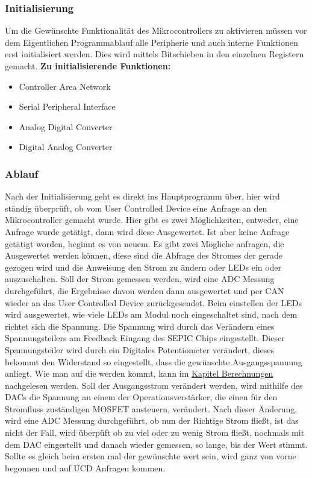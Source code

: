 \documentclass[paper=a4, 12pt]{scrreprt}
\begin{document}
		\subsubsection{Initialisierung}
		Um die Gewünschte Funktionalität des Mikrocontrollers zu aktivieren müssen vor dem Eigentlichen Programmablauf alle Peripherie und auch interne Funktionen erst initialisiert werden. Dies wird mittels Bitschieben in den einzelnen Registern gemacht. \hfill \break \hfill \break		
		\textbf{Zu initialisierende Funktionen:}
		\begin{itemize}
			\item Controller Area Network
			\item Serial Peripheral Interface
			\item Analog Digital Converter
			\item Digital Analog Converter
		\end{itemize}
	
		\subsubsection{Ablauf}
		Nach der Initialisierung geht es direkt ins Hauptprogramm über, hier wird ständig überprüft, ob vom User Controlled Device eine Anfrage an den Mikrocontroller gemacht wurde. Hier gibt es zwei Möglichkeiten, entweder, eine Anfrage wurde getätigt, dann wird diese Ausgewertet. Ist aber keine Anfrage getätigt worden, beginnt es von neuem.\hfill \break \hfill \break
		Es gibt zwei Mögliche anfragen, die Ausgewertet werden können, diese sind die Abfrage des Stromes der gerade gezogen wird und die Anweisung den Strom zu ändern oder LEDs ein oder auszuschalten.\hfill \break \hfill \break
		Soll der Strom gemessen werden, wird eine ADC Messung durchgeführt, die Ergebnisse davon werden dann ausgewertet und per CAN wieder an das User Controlled Device zurückgesendet.\hfill \break \hfill \break
		Beim einstellen der LEDs wird ausgewertet, wie viele LEDs am Modul noch eingeschaltet sind, nach dem richtet sich die Spannung. Die Spannung wird durch das Verändern eines Spannungsteilers am Feedback Eingang des SEPIC Chips eingestellt. Dieser Spannungsteiler wird durch ein Digitales Potentiometer verändert, dieses bekommt den Widerstand so eingestellt, dass die gewünschte Ausgangsspannung anliegt. Wie man auf die werden kommt, kann im  \hyperref[sec:berechnungen]{Kapitel Berechnungen} nachgelesen werden.\hfill \break \hfill \break
		Soll der Ausgangsstrom verändert werden, wird mithilfe des DACs die Spannung an einem der Operationsverstärker, die einen für den Stromfluss zuständigen MOSFET ansteuern, verändert. Nach dieser Änderung, wird eine ADC Messung durchgeführt, ob nun der Richtige Strom fließt, ist das nicht der Fall, wird überpüft ob zu viel oder zu wenig Strom fließt, nochmals mit dem DAC eingestellt und danach wieder gemessen, so lange, bis der Wert stimmt. Sollte es gleich beim ersten mal der gewünschte wert sein, wird ganz von vorne begonnen und auf UCD Anfragen kommen.
		\newpage
		
\end{document}
